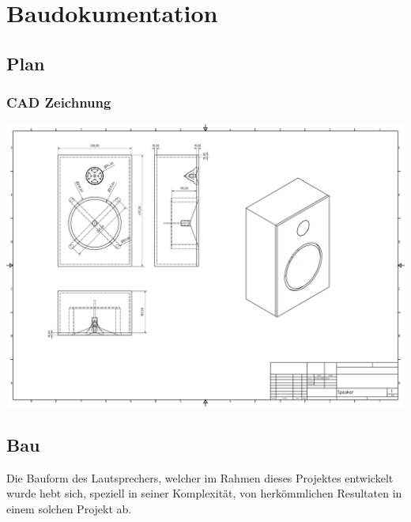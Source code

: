 \documentclass[a4paper,11pt]{report}
\begin{document}
\part{Baudokumentation}

\chapter{Plan}
\section{CAD Zeichnung}
\includegraphics[width=1\textwidth]{resources/pdf/Speaker.pdf}
\chapter{Bau}
Die Bauform des Lautsprechers, welcher im Rahmen dieses Projektes entwickelt wurde hebt sich, speziell in seiner Komplexität, von herkömmlichen Resultaten in einem solchen Projekt ab. 
\end{document}
